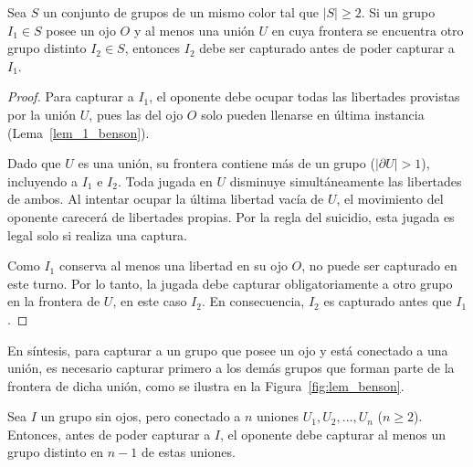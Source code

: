 \begin{lemma}\label{lem_2_benson}
	Sea $S$ un conjunto de grupos de un mismo color tal que $|S| \ge 2$. Si un grupo $I_1 \in S$ posee un ojo $O$ y al menos una unión $U$ en cuya frontera se encuentra otro grupo distinto $I_2 \in S$, entonces $I_2$ debe ser capturado antes de poder capturar a $I_1$.
\end{lemma}
\begin{proof}
	Para capturar a $I_{1}$, el oponente debe ocupar todas las libertades provistas por la unión $U$, pues las del ojo $O$ solo pueden llenarse en última instancia (Lema~\ref{lem_1_benson}).
	
	Dado que $U$ es una unión, su frontera contiene más de un grupo ($|\partial U| > 1$), incluyendo a $I_1$ e $I_2$. Toda jugada en $U$ disminuye simultáneamente las libertades de ambos. Al intentar ocupar la última libertad vacía de $U$, el movimiento del oponente carecerá de libertades propias. Por la regla del suicidio, esta jugada es legal solo si realiza una captura.
	
	Como $I_1$ conserva al menos una libertad en su ojo $O$, no puede ser capturado en este turno. Por lo tanto, la jugada debe capturar obligatoriamente a otro grupo en la frontera de $U$, en este caso $I_2$. En consecuencia, $I_2$ es capturado antes que $I_1$.
\end{proof}
En síntesis, para capturar a un grupo que posee un ojo y está conectado a una unión, es necesario capturar primero a los demás grupos que forman parte de la frontera de dicha unión, como se ilustra en la Figura~\ref{fig:lem_benson}.
\begin{lemma}\label{lem_3_benson}
	Sea $I$ un grupo sin ojos, pero conectado a $n$ uniones $U_1, U_2, \dots, U_n$ ($n \ge 2$). Entonces, antes de poder capturar a $I$, el oponente debe capturar al menos un grupo distinto en $n-1$ de estas uniones.
\end{lemma}
